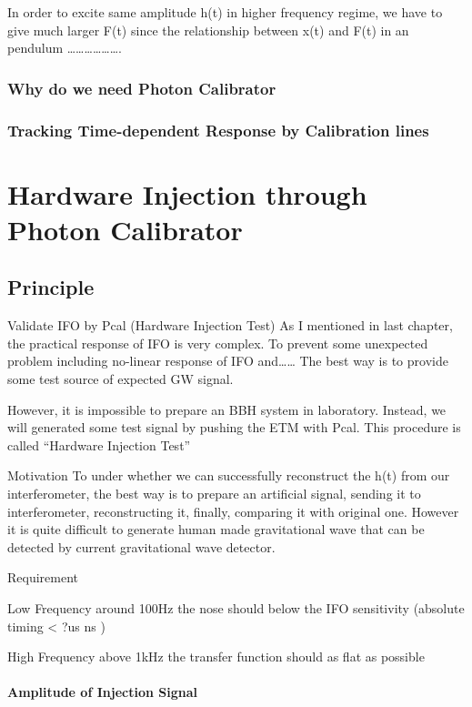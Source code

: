 \documentclass[12pt]{caltech_thesis}
\begin{document}
In order to excite same amplitude h(t) in higher frequency regime, we have to give much larger F(t) since the relationship between x(t) and F(t) in an pendulum ……………….



\subsection{Why do we need Photon Calibrator}
\subsection{Tracking Time-dependent Response by Calibration lines}








\chapter{Hardware Injection through Photon Calibrator}
\section{Principle}
 


Validate IFO by Pcal (Hardware Injection Test)
As I mentioned in last chapter, the practical response of IFO is very complex. To prevent some unexpected problem including no-linear response of IFO and……  
The best way is to provide some test source of expected GW signal.

However, it is impossible to prepare an BBH system in laboratory. Instead, we will generated some test signal by pushing the ETM with Pcal. This procedure is called “Hardware Injection Test”


Motivation
To under whether we can successfully reconstruct the h(t) from our interferometer, the best way is to prepare an artificial signal, sending it to interferometer, reconstructing it, finally, comparing it with original one. However it is quite difficult to generate human made gravitational wave that can be detected by current gravitational wave detector.

Requirement

Low Frequency
around 100Hz  the nose should below the IFO sensitivity
(absolute timing < ?us ns )

High Frequency
above 1kHz    the transfer function should as flat as possible


\subsubsection{Amplitude of Injection Signal}
\end{document}
